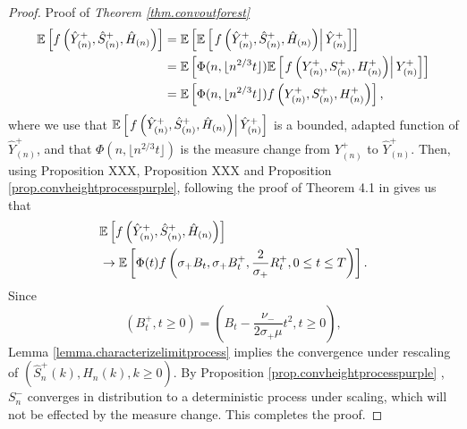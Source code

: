 \begin{proof}{Proof of \emph{Theorem \ref{thm.convoutforest}}}
\begin{align*}{\mathbb E}\left[f\left(\hat{Y}^+_{(n)}, \hat{S}^+_{(n)},  \hat{H}_{(n)}\right) \right]&= {\mathbb E}\left[ {\mathbb E}\left[\left. f\left(\hat{Y}^+_{(n)},\hat{S}^+_{(n)},  \hat{H}_{(n)}\right)\right|\hat{Y}^+_{(n)}\right]\right]\\&={\mathbb E}\left[ \Phi(n,\lfloor n^{2/3} t\rfloor){\mathbb E}\left[\left.f\left(Y^+_{(n)}, S^+_{(n)},  H^+_{(n)}\right)\right| {Y}^+_{(n)}\right]\right]\\&={\mathbb E}\left[ \Phi(n,\lfloor n^{2/3} t\rfloor)f\left(Y^+_{(n)},S^+_{(n)},  H^+_{(n)}\right)\right],\end{align*}
where we use that ${\mathbb E}\left[\left. f\left(\hat{Y}^+_{(n)},\hat{S}^+_{(n)},  \hat{H}_{(n)}\right)\right|\hat{Y}^+_{(n)}\right]$ is a bounded, adapted function of $\hat{Y}^+_{(n)}$, and that $\Phi(n,\lfloor n^{2/3} t\rfloor)$ is the measure change from ${Y}^+_{(n)}$ to $\hat{Y}^+_{(n)}$. Then, using Proposition XXX, Proposition XXX  and Proposition \ref{prop.convheightprocesspurple}, following the proof of Theorem 4.1 in \cite{Conchon2018} gives us that 
\begin{align*}
    &{\mathbb E}\left[f\left(\hat{Y}^+_{(n)},\hat{S}^+_{(n)},  \hat{H}_{(n)}\right) \right]\\
    &\to {\mathbb E}\left[\Phi(t)f\left(\sigma_+ B_t,\sigma_+ B^+_t,\frac{2}{\sigma_+}R^+_t,0\leq t \leq T\right)\right].
\end{align*}
Since $$(B^+_t,t\geq 0)=\left(B_t-\frac{\nu_-}{2\sigma_+ \mu}t^2,t\geq 0\right),$$
Lemma \ref{lemma.characterizelimitprocess} implies the convergence under rescaling of $(\hat{S}^+_n(k),\hat{H}_n(k),k\geq 0)$. By Proposition \ref{prop.convheightprocesspurple} , $S^{-}_n$ converges in distribution to a deterministic process under scaling, which will not be effected by the measure change. This completes the proof. 
\end{proof}

